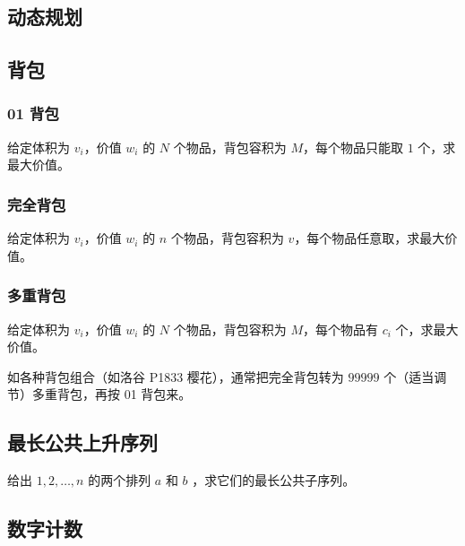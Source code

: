 \documentclass{probook}
\begin{document}
\begin{multicols}{2}
\chapter{动态规划}

\section{背包}

\subsection{01 背包}

给定体积为 $v_i$，价值 $w_i$ 的 $N$ 个物品，背包容积为 $M$，每个物品只能取 $1$ 个，求最大价值。



\subsection{完全背包}

给定体积为 $v_i$，价值 $w_i$ 的 $n$ 个物品，背包容积为 $v$，每个物品任意取，求最大价值。



\subsection{多重背包}

给定体积为 $v_i$，价值 $w_i$ 的 $N$ 个物品，背包容积为 $M$，每个物品有 $c_i$ 个，求最大价值。

如各种背包组合（如洛谷 P1833 樱花），通常把完全背包转为 $99999$ 个（适当调节）多重背包，再按 01 背包来。



\section{最长公共上升序列}

给出 $1,2,\ldots,n$ 的两个排列 $a$ 和 $b$ ，求它们的最长公共子序列。



\section{数字计数}


\end{multicols}
\end{document}

